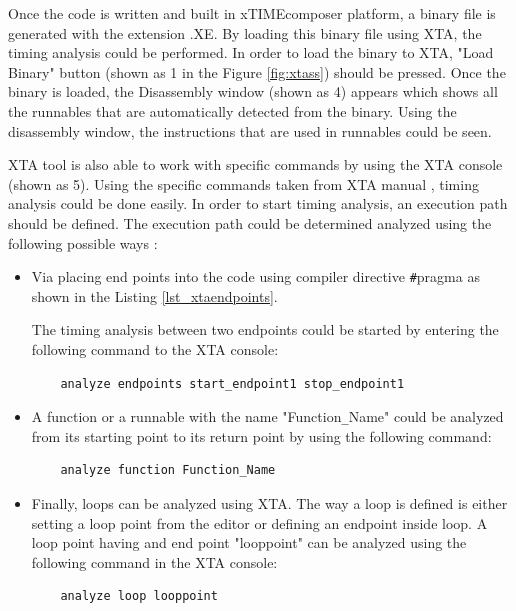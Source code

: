 Once the code is written and built in xTIMEcomposer platform, a binary file is generated with the extension .XE. By loading this binary file using XTA, the timing analysis could be performed. In order to load the binary to XTA, "Load Binary" button (shown as 1 in the Figure \ref{fig:xtass}) should be pressed. Once the binary is loaded, the Disassembly window (shown as 4) appears which shows all the runnables that are automatically detected from the binary. Using the disassembly window, the instructions that are used in runnables could be seen. 

XTA tool is also able to work with specific commands by using the XTA console (shown as 5). Using the specific commands taken from XTA manual \cite{xtamanual}, timing analysis could be done easily. In order to start timing analysis, an execution path should be defined. The execution path could be determined analyzed using the following possible ways \cite{xtamanual}:

\begin{itemize}
	\item Via placing end points into the code using compiler directive \texttt{\#}pragma as shown in the Listing \ref{lst_xtaendpoints}.
	
	The timing analysis between two endpoints could be started by entering the following command to the XTA console:
	\begin{lstlisting}
	analyze endpoints start_endpoint1 stop_endpoint1
	\end{lstlisting}
	\item A function or a runnable with the name "Function\texttt{\_}Name" could be analyzed from its starting point to its return point by using the following command:
	\begin{lstlisting}
	analyze function Function_Name
	\end{lstlisting}
	\item Finally, loops can be analyzed using XTA. The way a loop is defined is either setting a loop point from the editor or defining an endpoint inside loop. A loop point having and end point "looppoint" can be analyzed using the following command in the XTA console: \\
	\begin{lstlisting}
	analyze loop looppoint
	\end{lstlisting}
\end{itemize}

